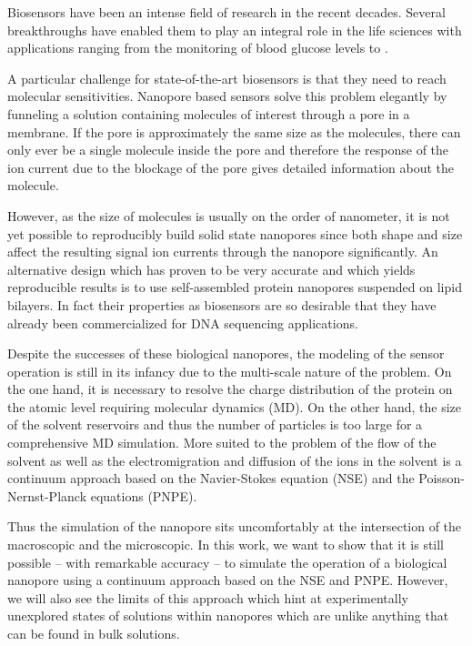 \documentclass[journal=ancac3,manuscript=article,etalmode=truncate,maxauthors=0,layout=twocolumn]{achemso}
\begin{document}
Biosensors have been an intense field of research in the recent decades\cite{Zhang-2016}. Several 
breakthroughs have enabled them to play an integral role in the life sciences with applications ranging from 
the monitoring of blood glucose levels\cite{Chen-2013} to .

A particular challenge for state-of-the-art biosensors is that they need to reach molecular sensitivities.  
Nanopore based sensors solve this problem elegantly by funneling a solution containing molecules of interest 
through a pore in a membrane. If the pore is approximately the same size as the molecules, there can only 
ever be a single molecule inside the pore and therefore the response of the ion current due to the blockage 
of the pore gives detailed information about the molecule.

However, as the size of molecules is usually on the order of nanometer, it is not yet possible to reproducibly
build solid state nanopores since both shape and size affect the resulting signal ion currents 
through the nanopore significantly. An alternative design which has proven to be very accurate and which 
yields reproducible results is to use self-assembled protein nanopores suspended on lipid 
bilayers\cite{Deamer-2016}.
In fact their properties as biosensors are so desirable that they have already been commercialized for DNA
sequencing applications.

Despite the successes of these biological nanopores, the modeling of the sensor operation is still in its 
infancy due to the multi-scale nature of the problem. On the one hand, it is necessary to resolve the charge 
distribution of the protein on the atomic level requiring molecular dynamics (MD).  On the other 
hand, the size of the solvent reservoirs and thus the number of particles is too large for a comprehensive MD 
simulation. More suited to the problem of the flow of the solvent as well as the electromigration and 
diffusion of the ions in the solvent is a continuum approach based on the Navier-Stokes equation (NSE) and 
the Poisson-Nernst-Planck equations (PNPE).

Thus the simulation of the nanopore sits uncomfortably at the intersection of the macroscopic and the
microscopic. In this work, we want to show that it is still possible -- with remarkable accuracy -- to 
simulate the operation of a biological nanopore using a continuum approach based on the NSE and PNPE. 
However, we will also see the limits of this approach which hint at experimentally unexplored states of
solutions within nanopores which are unlike anything that can be found in bulk solutions.
\end{document}
